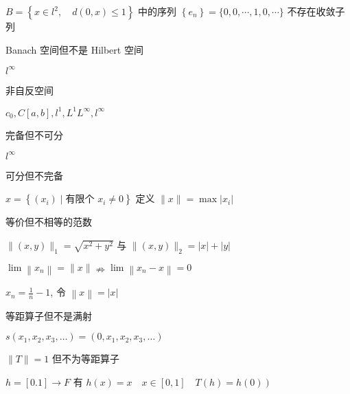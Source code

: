 \documentclass[10pt, twocolumn]{yerbaformat}
\begin{document}
$B=\left\{x \in l^{2}, \quad d(0, x) \leqslant 1\right\}$ 中的序列 $\left\{e_{n}\right\}=\{0,0, \cdots, 1,0, \cdots\}$ 不存在收敛子列

\begin{example}
    Banach 空间但不是 Hilbert 空间
\end{example}

$l^{\infty}$ 

\begin{example}
    非自反空间
\end{example}

$c_{0}, C[a, b], l^{1}, L^{1} L^{\infty}, l^{\infty}$



\begin{example}
    完备但不可分
\end{example}

$l^{\infty}$ 

\begin{example}
    可分但不完备
\end{example}

$x=\left\{\left(x_{i}\right) \mid \text{有限个 } x_{i} \neq 0\right\}$ 定义 $\|x\|=\max \left|x_{i}\right|$

\begin{example}
    等价但不相等的范数
\end{example}

$\|(x, y)\|_{1}=\sqrt{x^{2}+y^{2}}$ 与 $\|(x, y)\|_{2} = |x|+|y|$


\begin{example}
    $\lim \left\|x_{n}\right\|=\|x\| \nRightarrow \lim \left\|x_{n}-x\right\|=0$
\end{example}

$x_{n}=\frac{1}{n}-1$, 令 $\left\|x \right\|=|x|$

\begin{example}
    等距算子但不是满射
\end{example}

$s\left(x_{1}, x_{2}, x_{3}, \ldots\right)=\left(0, x_{1}, x_{2}, x_{3}, \ldots\right)$

\begin{example}
    $\|T\|=1$ 但不为等距算子
\end{example}

$h=[0.1] \rightarrow F$ 有 $\left.h(x)=x \quad x \in [0,1] \quad T(h)=h(0)\right)$
\end{document}
